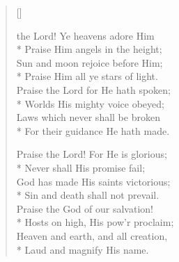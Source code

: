 \newHymn


\begin{verse}[\versewidth]

 the Lord! Ye heavens adore Him\\*
Praise Him angels in the height;\\
Sun and moon rejoice before Him;\\*
Praise Him all ye stars of light.\\
Praise the Lord for He hath spoken;\\*
Worlds His mighty voice obeyed;\\
Laws which never shall be broken\\*
For their guidance He hath made.

Praise the Lord! For He is glorious;\\*
Never shall  His promise fail;\\
God has made His saints victorious; \\*
Sin and death shall not prevail.\\
Praise the God of our salvation!\\*
Hosts on high, His pow'r proclaim;\\
Heaven and earth, and all creation,\\*
Laud and magnify His name.


\end{verse}

